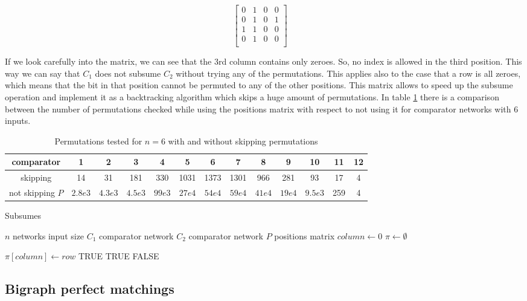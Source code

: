 \documentclass[../main.tex]{subfiles}
\begin{document}
	$$
	\begin{bmatrix} 
		0 & 1 & 0 & 0 \\
		0 & 1 & 0 & 1 \\
		1 & 1 & 0 & 0 \\
		0 & 1 & 0 & 0 \\
	\end{bmatrix}
	\quad
	$$
	
	If we look carefully into the matrix, we can see that the 3rd column contains only zeroes. So, no index is allowed in the third position. This way we can say that $C_1$ does not subsume $C_2$ without trying any of the permutations. This applies also to the case that a row is all zeroes, which means that the bit in that position cannot be permuted to any of the other positions. This matrix allows to speed up the subsume operation and implement it as a backtracking algorithm which skips a huge amount of permutations. In table \ref{table:compareSubsume} there is a comparison between the number of permutations checked while using the positions matrix with respect to not using it for comparator networks with 6 inputs.
	
	\begin{table}[H]
		\hspace*{-1.5cm}
		\begin{tabular}{|c |c c c c c c c c c c c c|}
			\hline
 			comparator & 1 & 2 & 3 & 4 & 5 & 6 & 7 & 8 & 9 & 10 & 11 & 12 \\
			\hline
			skipping & 14 & 31 & 181 & 330 & 1031 & 1373 & 1301 & 966 & 281 & 93 & 17 & 4 \\ [1ex]
			\hline
			not skipping $P$ & $2.8e3$ & $4.3e3$ & $4.5e3$ & $99e3$ & $27e4$ & $54e4$ & $59e4$ & $41e4$ & $19e4$ & $9.5e3$ & 259 & 4 \\  [1ex] 
			\hline
		\end{tabular}
		\caption{Permutations tested for $n=6$ with and without skipping permutations}
		\label{table:compareSubsume}
	\end{table}

	
	\begin{algorithm}[H]
		\caption {Subsumes}
		\begin{algorithmic}
			\State $n$ networks input size
			\State $C_1$ comparator network
			\State $C_2$ comparator network
			\State $P$ positions matrix
			\State $column \leftarrow 0$
			\State $\pi \leftarrow \emptyset $ 
			
			\State $\pi[column] \leftarrow row $
			\Return TRUE
			\EndIf
			\EndIf
			\EndFor
			\Return TRUE
			\Else {}
			\Return FALSE
			\EndIf
			\EndProcedure
		\end{algorithmic}
	\end{algorithm}
	\subsection{Bigraph perfect matchings}
\end{document}
